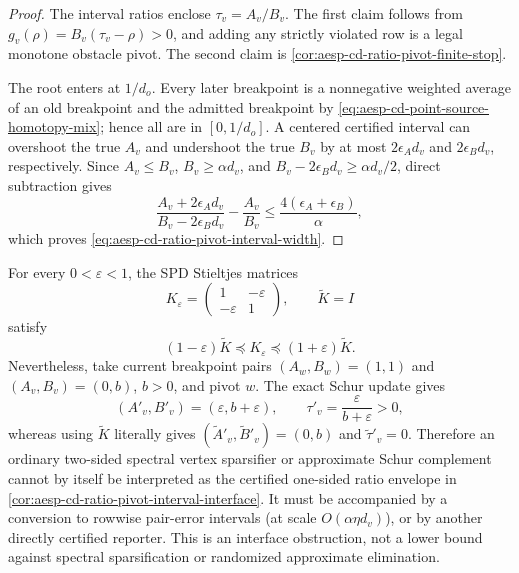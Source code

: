 \begin{proof}
The interval ratios enclose \(\tau_v=A_v/B_v\).  The first claim follows
from
\(g_v(\rho)=B_v(\tau_v-\rho)>0\), and adding any strictly violated row is a
legal monotone obstacle pivot.  The second claim is
\cref{cor:aesp-cd-ratio-pivot-finite-stop}.

The root enters at \(1/d_o\).  Every later breakpoint is a nonnegative
weighted average of an old breakpoint and the admitted breakpoint by
\cref{eq:aesp-cd-point-source-homotopy-mix}; hence all are in
\([0,1/d_o]\).  A centered certified interval can overshoot the true
\(A_v\) and undershoot the true \(B_v\) by at most
\(2\epsilon_A d_v\) and \(2\epsilon_Bd_v\), respectively.  Since
\(A_v\leq B_v\), \(B_v\geq\alpha d_v\), and
\(B_v-2\epsilon_Bd_v\geq\alpha d_v/2\), direct subtraction gives
\begin{equation*}
 \frac{A_v+2\epsilon_A d_v}{B_v-2\epsilon_Bd_v}
 -\frac{A_v}{B_v}
 \leq\frac{4(\epsilon_A+\epsilon_B)}{\alpha},
\end{equation*}
which proves \cref{eq:aesp-cd-ratio-pivot-interval-width}.
\end{proof}

\begin{proposition}
\label{prop:aesp-cd-spectral-schur-ratio-stop}
For every \(0<\varepsilon<1\), the SPD Stieltjes matrices
\begin{equation*}
 K_\varepsilon=
 \begin{pmatrix}1&-\varepsilon\\-\varepsilon&1\end{pmatrix},
 \qquad
 \widetilde K=I
\end{equation*}
satisfy
\begin{equation*}
 (1-\varepsilon)\widetilde K
 \preceq K_\varepsilon
 \preceq(1+\varepsilon)\widetilde K.
\end{equation*}
Nevertheless, take current breakpoint pairs
\((A_w,B_w)=(1,1)\) and \((A_v,B_v)=(0,b)\), \(b>0\), and pivot \(w\).
The exact Schur update gives
\begin{equation*}
 (A'_v,B'_v)=(\varepsilon,b+\varepsilon),
 \qquad \tau'_v=\frac{\varepsilon}{b+\varepsilon}>0,
\end{equation*}
whereas using \(\widetilde K\) literally gives
\((\widetilde A'_v,\widetilde B'_v)=(0,b)\) and
\(\widetilde\tau'_v=0\).
Therefore an ordinary two-sided spectral vertex sparsifier or approximate
Schur complement cannot by itself be interpreted as the certified one-sided
ratio envelope in
\cref{cor:aesp-cd-ratio-pivot-interval-interface}.  It must be accompanied
by a conversion to rowwise pair-error intervals (at scale
\(O(\alpha\eta d_v)\)), or by another directly certified reporter.  This is
an interface obstruction, not a lower bound against spectral sparsification
or randomized approximate elimination.
\end{proposition}

